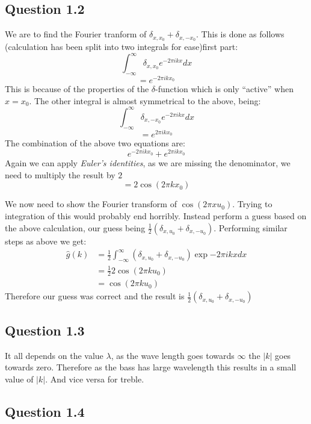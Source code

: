 \documentclass[a4paper, 10pt, final]{article}
\begin{document}
\subsection*{Question 1.2}
We are to find the Fourier tranform of $\delta_{x,x_{0}} + \delta_{x,-x_{0}}$. This is done as follows (calculation has been split into two integrals for ease)first part:
\begin{equation*}
   \int_{-\infty}^{\infty} {\delta_{x,x_{0}} e^{-2\pi ikx}dx}
\end{equation*}
\[
  = e^{-2 \pi ikx_{0}}
\]
This is because of the properties of the $\delta$-function which is only ``active'' when $x = x_{0}$. The other integral is almost symmetrical to the above, being:
\begin{equation*}
   \int_{-\infty}^{\infty} {\delta_{x,-x_{0}} e^{-2\pi ikx}dx}
\end{equation*}
\[
  = e^{2 \pi ikx_{0}}
\]
The combination of the above two equations are:
\[
e^{-2\pi ikx_{0}} + e^{2\pi ikx_{0}}
\]
Again we can apply \textit{Euler's identities}, as we are missing the denominator, we need to multiply the result by $2$
\[
= 2 \cos{(2\pi kx_{0})}
\]

We now need to show the Fourier transform of $\cos{(2\pi
  xu_{0})}$. Trying to integration of this would probably end
horribly. Instead perform a guess based on the above calculation, our
guess being $\frac{1}{2}(\delta_{x,u_{0}} +
\delta_{x,-u_{0}})$. Performing similar steps as above we get:
\begin{align*}
  \hat{g}(k) & = \frac{1}{2} \int_{-\infty}^{\infty} {(\delta_{x,u_{0}} +\delta_{x,-u_{0}})\exp{-2\pi ikx}dx}\\
  & = \frac{1}{2} 2 \cos{(2\pi ku_{0})} \\
  & = \cos{(2\pi ku_{0})}
\end{align*}
Therefore our guess was correct and the result is
$\frac{1}{2}(\delta_{x,u_{0}} + \delta_{x,-u_{0}})$

\subsection*{Question 1.3}
It all depends on the value $\lambda$, as the wave length goes towards $\infty$ the $|k|$ goes towards zero. Therefore as the bass has large wavelength this results in a small value of $|k|$. And vice versa for treble.

\subsection*{Question 1.4}
\end{document}
